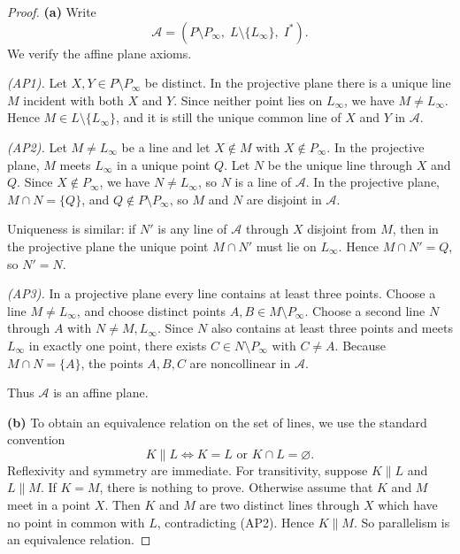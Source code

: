 \documentclass[11pt, a4paper]{ctexrep}
\begin{document}
\begin{proof}
    \noindent\textbf{(a)}
    Write
    \[
        \mathcal{A}=(P\setminus P_\infty,\; L\setminus\{L_\infty\},\; I^*).
    \]
    We verify the affine plane axioms.

    \emph{(AP1).} Let \(X,Y\in P\setminus P_\infty\) be distinct. In the projective plane there is a unique
    line \(M\) incident with both \(X\) and \(Y\). Since neither point lies on \(L_\infty\), we have
    \(M\ne L_\infty\). Hence \(M\in L\setminus\{L_\infty\}\), and it is still the unique common line of
    \(X\) and \(Y\) in \(\mathcal{A}\).

    \emph{(AP2).} Let \(M\ne L_\infty\) be a line and let \(X\notin M\) with \(X\notin P_\infty\).
    In the projective plane, \(M\) meets \(L_\infty\) in a unique point \(Q\). Let \(N\) be the unique
    line through \(X\) and \(Q\). Since \(X\notin P_\infty\), we have \(N\ne L_\infty\), so \(N\) is a line
    of \(\mathcal{A}\). In the projective plane, \(M\cap N=\{Q\}\), and \(Q\notin P\setminus P_\infty\), so
    \(M\) and \(N\) are disjoint in \(\mathcal{A}\).

    Uniqueness is similar: if \(N'\) is any line of \(\mathcal{A}\) through \(X\) disjoint from \(M\), then
    in the projective plane the unique point \(M\cap N'\) must lie on \(L_\infty\). Hence \(M\cap N'=Q\),
    so \(N'=N\).

    \emph{(AP3).} In a projective plane every line contains at least three points. Choose a line
    \(M\ne L_\infty\), and choose distinct points \(A,B\in M\setminus P_\infty\). Choose a second line
    \(N\) through \(A\) with \(N\ne M,L_\infty\). Since \(N\) also contains at least three points and meets
    \(L_\infty\) in exactly one point, there exists \(C\in N\setminus P_\infty\) with \(C\ne A\). Because
    \(M\cap N=\{A\}\), the points \(A,B,C\) are noncollinear in \(\mathcal{A}\).

    Thus \(\mathcal{A}\) is an affine plane.

    \medskip
    \noindent\textbf{(b)}
    To obtain an equivalence relation on the set of lines, we use the standard convention
    \[
        K\parallel L
        \iff
        K=L \text{ or } K\cap L=\varnothing.
    \]
    Reflexivity and symmetry are immediate. For transitivity, suppose \(K\parallel L\) and \(L\parallel M\).
    If \(K=M\), there is nothing to prove. Otherwise assume that \(K\) and \(M\) meet in a point \(X\).
    Then \(K\) and \(M\) are two distinct lines through \(X\) which have no point in common with \(L\),
    contradicting (AP2). Hence \(K\parallel M\). So parallelism is an equivalence relation.


\end{proof}
\end{document}
